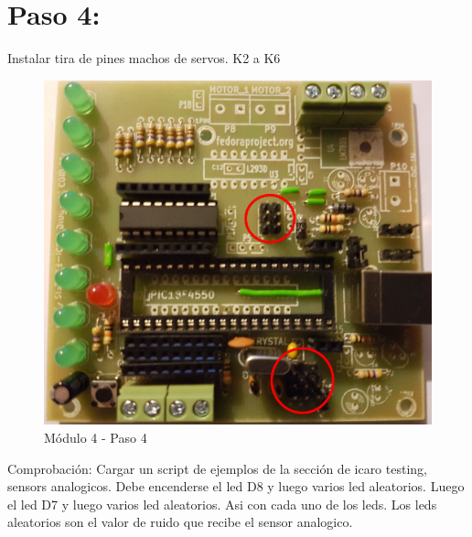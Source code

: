 \newpage

\section{Paso 4:}

Instalar tira de pines machos de servos. K2 a K6

\begin{figure}[h]
	\centering
	\includegraphics[width=0.8\linewidth]{Modulo_4/M4_4}
	\caption{Módulo 4 - Paso 4}
	\label{fig:M4_4}
\end{figure}

\newpage

Comprobación:
Cargar un script de ejemplos de la sección de icaro testing, sensors analogicos. Debe encenderse el led D8 y luego varios led aleatorios. Luego el led D7 y luego varios led aleatorios. Asi con cada uno de los leds. Los leds aleatorios son el valor de ruido que recibe el sensor analogico.

